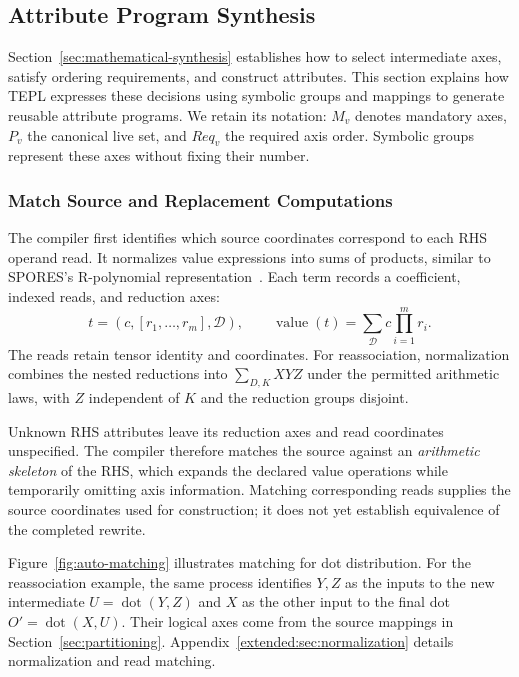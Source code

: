 \subsection{Attribute Program Synthesis}
\label{sec:synthesis}
Section~\ref{sec:mathematical-synthesis} establishes how to select intermediate
axes, satisfy ordering requirements, and construct attributes. This section
explains how TEPL expresses these decisions using symbolic groups and mappings
to generate reusable attribute programs. We retain its notation: $M_v$ denotes
mandatory axes, $P_v$ the canonical live set, and $Req_v$ the required axis order.
Symbolic groups represent these axes without fixing their number.

\subsubsection{Match Source and Replacement Computations}
\label{sec:normalization}
The compiler first identifies which source coordinates correspond to each
RHS operand read. It normalizes value expressions into sums of products,
similar to SPORES's R-polynomial representation~\cite[Section~2.3, Definition~2.4]{spores}.
Each term records a coefficient, indexed reads, and reduction axes:
\begin{equation}
 t=(c,[r_1,\ldots,r_m],\mathcal D),\qquad
 \operatorname{value}(t)=\sum_{\mathcal D}c\prod_{i=1}^{m}r_i.
 \label{eq:normalized-term}
\end{equation}
The reads retain tensor identity and coordinates. For reassociation,
normalization combines the nested reductions into $\sum_{D,K}XYZ$ under
the permitted arithmetic laws, with $Z$ independent of $K$ and the reduction
groups disjoint.

Unknown RHS attributes leave its reduction axes and read coordinates
unspecified. The compiler therefore matches the source against an
\emph{arithmetic skeleton} of the RHS, which expands the declared value
operations while temporarily omitting axis information. Matching corresponding
reads supplies the source coordinates used for construction; it does not yet
establish equivalence of the completed rewrite.

Figure~\ref{fig:auto-matching} illustrates matching for dot distribution.
For the reassociation example, the same process identifies $Y,Z$ as the
inputs to the new intermediate $U=\operatorname{dot}(Y,Z)$ and $X$ as
the other input to the final dot $O'=\operatorname{dot}(X,U)$.
Their logical axes come from the source mappings in
Section~\ref{sec:partitioning}. Appendix~\ref{extended:sec:normalization}
details normalization and read matching.

